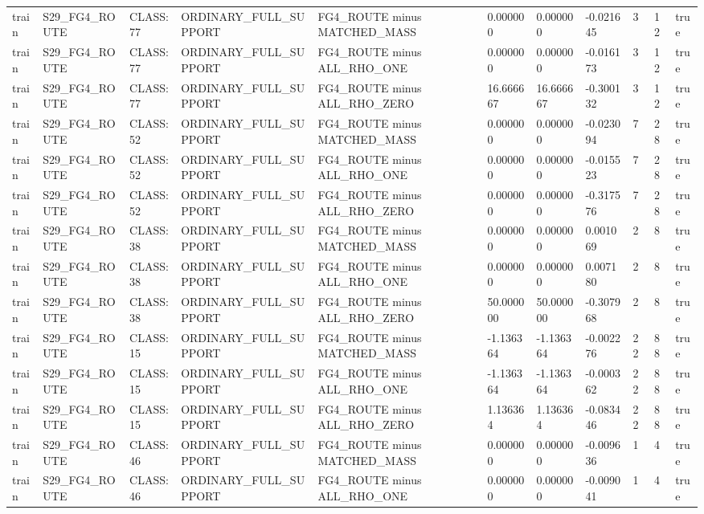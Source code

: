 \begin{tabular}{lllllllllll}
train & S29\_FG4\_ROUTE & CLASS:77 & ORDINARY\_FULL\_SUPPORT & FG4\_ROUTE minus MATCHED\_MASS & 0.000000 & 0.000000 & -0.021645 & 3 & 12 & true \\
train & S29\_FG4\_ROUTE & CLASS:77 & ORDINARY\_FULL\_SUPPORT & FG4\_ROUTE minus ALL\_RHO\_ONE & 0.000000 & 0.000000 & -0.016173 & 3 & 12 & true \\
train & S29\_FG4\_ROUTE & CLASS:77 & ORDINARY\_FULL\_SUPPORT & FG4\_ROUTE minus ALL\_RHO\_ZERO & 16.666667 & 16.666667 & -0.300132 & 3 & 12 & true \\
train & S29\_FG4\_ROUTE & CLASS:52 & ORDINARY\_FULL\_SUPPORT & FG4\_ROUTE minus MATCHED\_MASS & 0.000000 & 0.000000 & -0.023094 & 7 & 28 & true \\
train & S29\_FG4\_ROUTE & CLASS:52 & ORDINARY\_FULL\_SUPPORT & FG4\_ROUTE minus ALL\_RHO\_ONE & 0.000000 & 0.000000 & -0.015523 & 7 & 28 & true \\
train & S29\_FG4\_ROUTE & CLASS:52 & ORDINARY\_FULL\_SUPPORT & FG4\_ROUTE minus ALL\_RHO\_ZERO & 0.000000 & 0.000000 & -0.317576 & 7 & 28 & true \\
train & S29\_FG4\_ROUTE & CLASS:38 & ORDINARY\_FULL\_SUPPORT & FG4\_ROUTE minus MATCHED\_MASS & 0.000000 & 0.000000 & 0.001069 & 2 & 8 & true \\
train & S29\_FG4\_ROUTE & CLASS:38 & ORDINARY\_FULL\_SUPPORT & FG4\_ROUTE minus ALL\_RHO\_ONE & 0.000000 & 0.000000 & 0.007180 & 2 & 8 & true \\
train & S29\_FG4\_ROUTE & CLASS:38 & ORDINARY\_FULL\_SUPPORT & FG4\_ROUTE minus ALL\_RHO\_ZERO & 50.000000 & 50.000000 & -0.307968 & 2 & 8 & true \\
train & S29\_FG4\_ROUTE & CLASS:15 & ORDINARY\_FULL\_SUPPORT & FG4\_ROUTE minus MATCHED\_MASS & -1.136364 & -1.136364 & -0.002276 & 22 & 88 & true \\
train & S29\_FG4\_ROUTE & CLASS:15 & ORDINARY\_FULL\_SUPPORT & FG4\_ROUTE minus ALL\_RHO\_ONE & -1.136364 & -1.136364 & -0.000362 & 22 & 88 & true \\
train & S29\_FG4\_ROUTE & CLASS:15 & ORDINARY\_FULL\_SUPPORT & FG4\_ROUTE minus ALL\_RHO\_ZERO & 1.136364 & 1.136364 & -0.083446 & 22 & 88 & true \\
train & S29\_FG4\_ROUTE & CLASS:46 & ORDINARY\_FULL\_SUPPORT & FG4\_ROUTE minus MATCHED\_MASS & 0.000000 & 0.000000 & -0.009636 & 1 & 4 & true \\
train & S29\_FG4\_ROUTE & CLASS:46 & ORDINARY\_FULL\_SUPPORT & FG4\_ROUTE minus ALL\_RHO\_ONE & 0.000000 & 0.000000 & -0.009041 & 1 & 4 & true \\

\end{tabular}
